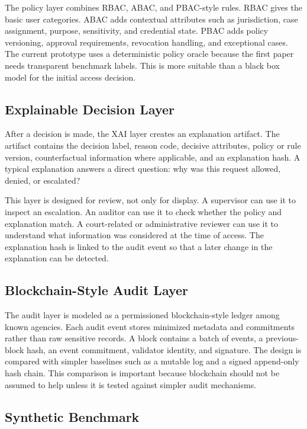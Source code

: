 The policy layer combines RBAC, ABAC, and PBAC-style rules. RBAC gives the
basic user categories. ABAC adds contextual attributes such as jurisdiction,
case assignment, purpose, sensitivity, and credential state. PBAC adds policy
versioning, approval requirements, revocation handling, and exceptional cases.
The current prototype uses a deterministic policy oracle because the first
paper needs transparent benchmark labels. This is more suitable than a black
box model for the initial access decision.

\subsection{Explainable Decision Layer}

After a decision is made, the XAI layer creates an explanation artifact. The
artifact contains the decision label, reason code, decisive attributes, policy
or rule version, counterfactual information where applicable, and an
explanation hash. A typical explanation answers a direct question: why was this
request allowed, denied, or escalated?

This layer is designed for review, not only for display. A supervisor can use
it to inspect an escalation. An auditor can use it to check whether the policy
and explanation match. A court-related or administrative reviewer can use it to
understand what information was considered at the time of access. The
explanation hash is linked to the audit event so that a later change in the
explanation can be detected.

\subsection{Blockchain-Style Audit Layer}

The audit layer is modeled as a permissioned blockchain-style ledger among
known agencies. Each audit event stores minimized metadata and commitments
rather than raw sensitive records. A block contains a batch of events, a
previous-block hash, an event commitment, validator identity, and signature.
The design is compared with simpler baselines such as a mutable log and a
signed append-only hash chain. This comparison is important because blockchain
should not be assumed to help unless it is tested against simpler audit
mechanisms.

\subsection{Synthetic Benchmark}

